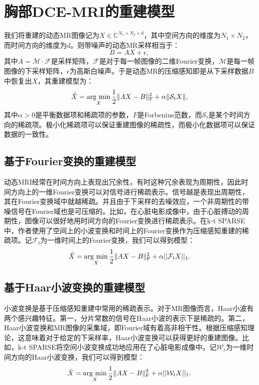 \section{胸部DCE-MRI的重建模型}
我们将重建的动态MR图像记为$X\in \mathbb{C}^{N_1\times N_2\times d}$，其中空间方向的维度为$N_1\times N_2$，而时间方向的维度为$d$。则带噪声的动态MR采样相当于：
$$B=AX+\epsilon,$$
其中$A=\mathcal{M}\cdot \mathcal{F}$是采样矩阵，$\mathcal{F}$是对于每一帧图像的二维Fourier变换，$\mathcal{M}$是每一帧图像的下采样矩阵，$\epsilon$为高斯白噪声。于是动态MR的压缩感知即是从下采样数据$B$中恢复出$X$，其重建模型为：
\begin{equation}
\hat{X} = \argmin_X \frac{1}{2}\|AX-B\|_\mathrm{F}^2 + \alpha\|\mathcal{S}_tX\|,
\end{equation}
其中$\alpha>0$是平衡数据项和稀疏项的参数，$F$是Forbenius范数，而$\mathcal{S}_t$是某个时间方向的稀疏项。极小化稀疏项可以保证重建图像的稀疏性，而极小化数据项可以保证数据的一致性。

\subsection{基于Fourier变换的重建模型}
动态MRI经常在时间方向上表现出冗余性，有时这种冗余表现为周期性，因此时间方向上的一维Fourier变换可以对信号进行稀疏表示。信号越是表现出周期性，其在Fourier变换域中就越稀疏。并且由于下采样的去噪效应，一个非周期性的带噪信号在Fourier域也是可压缩的。比如，在心脏电影成像中，由于心脏搏动的周期性，图像可以很好地用时间方向的Fourier变换进行稀疏表示。在k-t SPARSE\cite{Lustig2010Sparse}中，作者使用了空间上的小波变换和时间上的Fourier变换作为压缩感知重建的稀疏项。记$\mathcal{F}_t$为一维时间上的Fourier变换，我们可以得到模型：
\begin{equation}
\hat{X} = \argmin_X \frac{1}{2}\|AX-B\|_\mathrm{F}^2 + \alpha ||\mathcal{F}_t X||_1.
\end{equation}

\subsection{基于Haar小波变换的重建模型}
小波变换是基于压缩感知重建中常用的稀疏表示。对于MR图像而言，Haar小波有两个感兴趣特征。第一，分片常数的信号在Haar小波的表示下是稀疏的。第二，Haar小波变换和MR图像的采集域，即Fourier域有着高非相干性。根据压缩感知理论，这意味着对于给定的下采样率，Haar小波变换可以获得更好的重建图像。比如，k-t SPARSE\cite{Lustig2010Sparse}将空间小波变换成功地应用在了心脏电影成像中。记$\mathcal{W}_t$为一维时间方向的Haar小波变换，我们可以得到模型：
\begin{equation}
\hat{X} = \argmin_X \frac{1}{2}\|AX-B\|_\mathrm{F}^2 + \alpha ||\mathcal{W}_t X||_1.
\end{equation}

